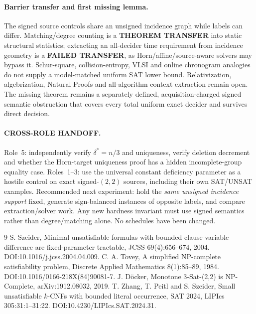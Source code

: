 \documentclass[11pt]{article}
\begin{document}
\paragraph{Barrier transfer and first missing lemma.}
The signed source controls share an unsigned incidence graph while labels can differ. Matching/degree counting is a \textbf{THEOREM TRANSFER} into static structural statistics; extracting an all-decider time requirement from incidence geometry is a \textbf{FAILED TRANSFER}, as Horn/affine/source-aware solvers may bypass it. Schur-square, collision-entropy, VLSI and online chronogram analogies do not supply a model-matched uniform SAT lower bound. Relativization, algebrization, Natural Proofs and all-algorithm context extraction remain open. The missing theorem remains a separately defined, acquisition-charged signed semantic obstruction that covers every total uniform exact decider and survives direct decision.
\paragraph{CROSS-ROLE HANDOFF.}
Role~5: independently verify $\delta^*=n/3$ and uniqueness, verify deletion decrement and whether the Horn-target uniqueness proof has a hidden incomplete-group equality case. Roles~1--3: use the universal constant deficiency parameter as a hostile control on exact signed-$(2,2)$ sources, including their own SAT/UNSAT examples. Recommended next experiment: hold the \emph{same unsigned incidence support} fixed, generate sign-balanced instances of opposite labels, and compare extraction/solver work. Any new hardness invariant must use signed semantics rather than degree/matching alone. No schedules have been changed.

\begin{thebibliography}{9}
 S. Szeider, Minimal unsatisfiable formulas with bounded clause-variable difference are fixed-parameter tractable, JCSS 69(4):656--674, 2004. DOI:10.1016/j.jcss.2004.04.009.
 C. A. Tovey, A simplified NP-complete satisfiability problem, Discrete Applied Mathematics 8(1):85--89, 1984. DOI:10.1016/0166-218X(84)90081-7.
 J. D\"ocker, Monotone 3-Sat-(2,2) is NP-Complete, arXiv:1912.08032, 2019.
 T. Zhang, T. Peitl and S. Szeider, Small unsatisfiable $k$-CNFs with bounded literal occurrence, SAT 2024, LIPIcs 305:31:1--31:22. DOI:10.4230/LIPIcs.SAT.2024.31.
\end{thebibliography}
\end{document}
